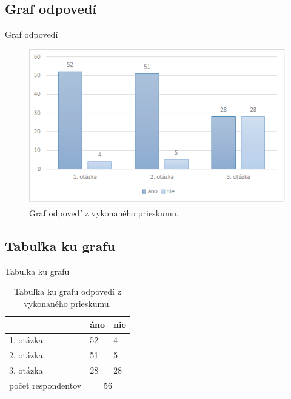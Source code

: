 \documentclass[10pt]{beamer}
\begin{document}
\subsection{Graf odpovedí}\label{prieskum:graf}
    \begin{frame}{Graf odpovedí}
    \begin{figure}[tbh]
\centering
\includegraphics[scale=0.9]{graf.png}
\caption{Graf odpovedí z vykonaného prieskumu.}
\label{graf}
\end{figure}
    
    \end{frame}

\subsection{Tabuľka ku grafu}\label{prieskum:tabulka}
    \begin{frame}{Tabuľka ku grafu}
   \begin{table}[]
\centering
\begin{tabular}{@{}lll@{}}
\toprule
                                & áno                     & nie                     \\ \midrule
\multicolumn{1}{|l|}{1. otázka} & \multicolumn{1}{l|}{52} & \multicolumn{1}{l|}{4}  \\ \midrule
\multicolumn{1}{|l|}{2. otázka} & \multicolumn{1}{l|}{51} & \multicolumn{1}{l|}{5}  \\ \midrule
\multicolumn{1}{|l|}{3. otázka} & \multicolumn{1}{l|}{28} & \multicolumn{1}{l|}{28} \\ \midrule
počet respondentov              & \multicolumn{2}{c}{56}                            \\ \bottomrule
\end{tabular}
\caption{Tabuľka ku grafu odpovedí z vykonaného prieskumu.}
\end{table}
    
    \end{frame}
\end{document}
